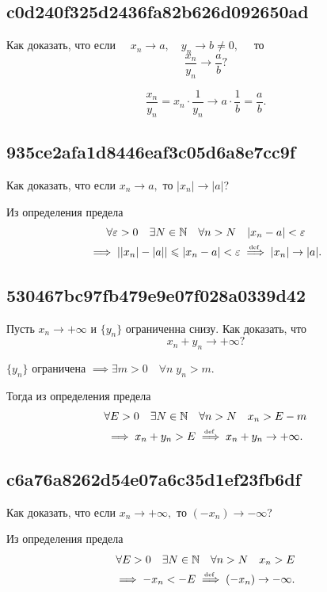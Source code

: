 \documentclass[11pt, a5paper]{article}
\newenvironment{note}[1]{\goodbreak\par\subsection{\hfill \color{lightgray}\tiny #1}}{}
\newenvironment{cloze}[2][\ldots]{\begin{leftbar}}{\end{leftbar}}
\begin{document}
    \begin{note}{c0d240f325d2436fa82b626d092650ad}
        Как доказать, что если \( \quad x_n \to a, \quad y_n \to b \neq 0, \quad \) то \[
            \frac{x_n}{y_n} \to \frac{a}{b}?
        \]

        \begin{cloze}{1}
            \[
                \frac{x_n}{y_n} = x_n \cdot \frac{1}{y_n} \to a \cdot \frac{1}{b} = \frac{a}{b}.
            \]
        \end{cloze}
    \end{note}

    \begin{note}{935ce2afa1d8446eaf3c05d6a8e7cc9f}
        Как доказать, что если \( x_n \to a,  \) то \( |x_n| \to |a| \)?

        \begin{cloze}{1}
            Из определения предела
            \begin{multline*}
                \forall \varepsilon > 0 \quad \exists N \in \mathbb N \quad \forall n > N \quad |x_n - a| < \varepsilon \\
                \implies | |x_n| - |a| | \leqslant  |x_n - a| < \varepsilon \overset{\!\!\text{\tiny def}}\implies |x_n| \to |a|.
            \end{multline*}
        \end{cloze}
   \end{note}

   \begin{note}{530467bc97fb479e9e07f028a0339d42}
        Пусть \( x_n \to +\infty \) и \( \{ y_n \} \) ограниченна снизу. Как доказать, что \[ x_n + y_n \to +\infty? \]

        \begin{cloze}{1}
            \( \{ y_n \} \) ограничена \( \implies \exists m > 0 \quad \forall n \; y_n > m. \)

            Тогда из определения предела
            \begin{multline*}
                \forall E > 0 \quad \exists N \in \mathbb N \quad \forall n > N \quad x_n > E - m \\
                \implies x_n + y_n > E \overset{\!\!\text{\tiny def}}\implies x_n + y_n \to +\infty.
            \end{multline*}
        \end{cloze}
   \end{note}

    \begin{note}{c6a76a8262d54e07a6c35d1ef23fb6df}
        Как доказать, что если \( x_n \to +\infty, \) то \( (-x_n) \to -\infty \)?

        \begin{cloze}{1}
            Из определения предела
            \begin{multline*}
                \forall E > 0 \quad \exists N \in \mathbb N \quad \forall n > N \quad x_n > E \\
                \implies -x_n < -E \overset{\!\!\text{\tiny def}}\implies (-x_n) \to -\infty.
            \end{multline*}
        \end{cloze}
    \end{note}
\end{document}
